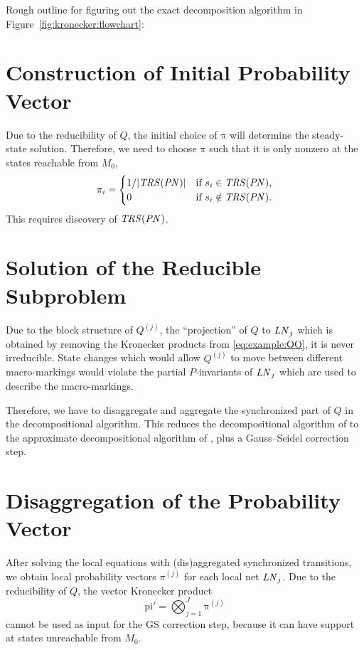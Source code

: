 \documentclass[a4paper,10pt,twoside,openright]{memoir}
\newcommand*{\PN}{\textnormal{\emph{PN}}}
\newcommand*{\LN}{\textnormal{\emph{LN}}}
\renewcommand*{\vec}[1]{\boldsymbol{\mathrm{#1}}}
\newcommand*{\TRS}{\textnormal{\emph{TRS}}}
\begin{document}
Rough outline for figuring out the exact decomposition algorithm
\citep{bao2008decompositional} in Figure~\ref{fig:kronecker:flowchart}:

\section{Construction of Initial Probability Vector}

Due to the reducibility of $Q$, the initial choice of $\vec{\pi}$ will
determine the steady-state solution. Therefore, we need to choose
$\vec{\pi}$ such that it is only nonzero at the states reachable from
$M_0$,
\begin{equation}
  \pi_i = \begin{cases}
    1 / \lvert \TRS(\PN) \rvert & \text{if $s_i \in \TRS(\PN)$,} \\
    0 & \text{if $s_i \notin \TRS(\PN)$.} \\
  \end{cases}
\end{equation}
This requires discovery of $\TRS(\PN)$.

\section{Solution of the Reducible Subproblem}

Due to the block structure of $Q^{(j)}$, the ``projection'' of $Q$ to
$\LN_j$ which is obtained by removing the Kronecker products from
\eqref{eq:example:QO}, it is never irreducible. State changes which
would allow $Q^{(j)}$ to move between different macro-markings would violate
the partial $P$-invariants of $\LN_j$ which are used to describe the
macro-markings.

Therefore, we have to disaggregate and aggregate the synchronized part
of $Q$ in the decompositional algorithm. This reduces the
decompositional algorithm of \citet{bao2008decompositional} to the
approximate decompositional algorithm of
\citet{DBLP:journals/sigmetrics/BuchholzK98}, plus a Gauss--Seidel
correction step.

\section{Disaggregation of the Probability Vector}

After solving the local equations with (dis)aggregated synchronized
transitions, we obtain local probability vectors $\pi^{(j)}$ for each
local net $\LN_j$. Due to the reducibility of $Q$, the
vector Kronecker product
\begin{equation}
  \vec{pi}' = \bigotimes_{j = 1}^J \vec{\pi}^{(j)}
\end{equation}
cannot be used as input for the GS correction step, because it can
have support at states unreachable from $M_0$.
\end{document}
